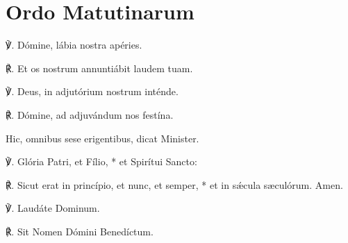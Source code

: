 \section{Ordo Matutinarum}
℣. Dómine, {} lábia nostra apéries.

℟. Et os nostrum annuntiábit laudem tuam.

℣. Deus, {} in adjutórium nostrum inténde.

℟. Dómine, ad adjuvándum nos festína.

\begin{rubric}
    Hic, omnibus sese erigentibus, dicat Minister.
\end{rubric}

℣. Glória Patri, et Fílio, * et Spirítui Sancto:

℟. Sicut erat in princípio, et nunc, et semper, * et in sǽcula s{\ae}culórum. Amen.

℣. Laudáte Dominum.

℟. Sit Nomen Dómini Benedíctum.

